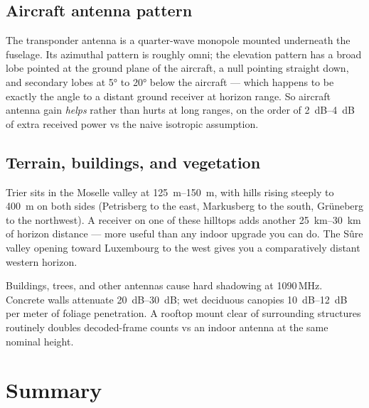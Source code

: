 \documentclass[11pt,a4paper]{article}
\begin{document}
\subsection{Aircraft antenna pattern}

The transponder antenna is a quarter-wave monopole mounted underneath
the fuselage.  Its azimuthal pattern is roughly omni; the elevation
pattern has a broad lobe pointed at the ground plane of the aircraft,
a null pointing straight down, and secondary lobes at
\ang{5} to \ang{20} below the aircraft --- which happens to be exactly
the angle to a distant ground receiver at horizon range.  So aircraft
antenna gain \emph{helps} rather than hurts at long ranges, on the
order of \SIrange{2}{4}{dB} of extra received power vs the naive
isotropic assumption.

\subsection{Terrain, buildings, and vegetation}

Trier sits in the Moselle valley at \SIrange{125}{150}{m}, with hills
rising steeply to \SI{400}{m} on both sides (Petrisberg to the east,
Markusberg to the south, Grüneberg to the northwest).  A receiver on
one of these hilltops adds another \SIrange{25}{30}{km} of horizon
distance --- more useful than any indoor upgrade you can do.  The
Sûre valley opening toward Luxembourg to the west gives you a
comparatively distant western horizon.

Buildings, trees, and other antennas cause hard shadowing at
1090\,MHz.  Concrete walls attenuate \SIrange{20}{30}{dB}; wet
deciduous canopies \SIrange{10}{12}{dB} per meter of foliage
penetration.  A rooftop mount clear of surrounding structures
routinely doubles decoded-frame counts vs an indoor antenna at the
same nominal height.

\section{Summary}\label{sec:summary}
\end{document}
